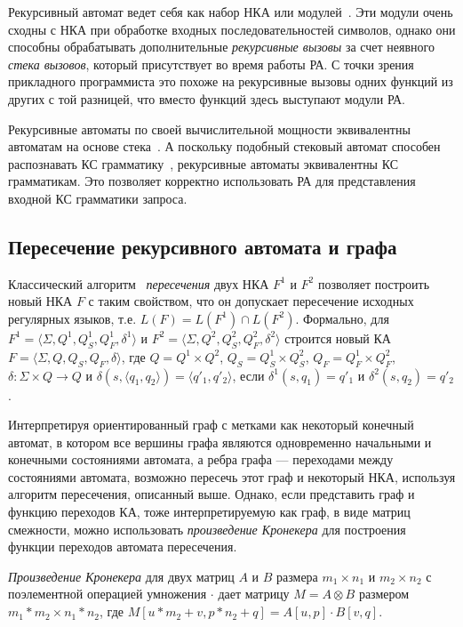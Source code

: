 Рекурсивный автомат ведет себя как набор НКА или модулей~\cite{article:recursive_state_machines}. Эти модули очень сходны с НКА при обработке входных последовательностей символов, однако они способны обрабатывать дополнительные \textit{рекурсивные вызовы} за счет неявного \textit{стека вызовов}, который присутствует во время работы РА. С точки зрения прикладного программиста это похоже на рекурсивные вызовы одних функций из других с той разницей, что вместо функций здесь выступают модули РА.

Рекурсивные автоматы по своей вычислительной мощности эквивалентны автоматам на основе стека~\cite{article:recursive_state_machines}. А поскольку подобный стековый автомат способен распознавать КС грамматику~\cite{book:automata_theory}, рекурсивные автоматы эквивалентны КС грамматикам. Это позволяет корректно использовать РА для представления входной КС грамматики запроса.

\subsection{Пересечение рекурсивного автомата и графа}

Классический алгоритм~\cite{book:automata_theory} \textit{пересечения} двух НКА $F^1$ и $F^2$ позволяет построить новый НКА $F$ с таким свойством, что он допускает пересечение исходных регулярных языков, т.е. $L(F) = L(F^1) \cap L(F^2)$. Формально, для $F^1 = \langle \Sigma, Q^1, Q^1_S, Q^1_F, \delta^1 \rangle$ и $F^2 = \langle \Sigma, Q^2, Q^2_S, Q^2_F, \delta^2 \rangle$ строится новый КА $F = \langle \Sigma, Q, Q_S, Q_F, \delta \rangle$, где $Q = Q^1 \times Q^2$, $Q_S = Q^1_S \times Q^2_S$, $Q_F = Q^1_F \times Q^2_F$, $\delta: \Sigma \times Q \rightarrow Q$ и $\delta(s, \langle q_1, q_2 \rangle) = \langle q'_1, q'_2 \rangle$, если $\delta^1 (s, q_1)=q'_1$ и $\delta^2 (s, q_2)=q'_2$. 

Интерпретируя ориентированный граф с метками как некоторый конечный автомат, в котором все вершины графа являются одновременно начальными и конечными состояниями автомата, а ребра графа --- переходами между состояниями автомата, возможно пересечь этот граф и некоторый НКА, используя алгоритм пересечения, описанный выше. Однако, если представить граф и функцию переходов КА, тоже интерпретируемую как граф, в виде матриц смежности, можно использовать \textit{произведение Кронекера} для построения функции переходов автомата пересечения.

\textit{Произведение Кронекера} для двух матриц $A$ и $B$ размера $m_1 \times n_1$ и $m_2 \times n_2$ с поэлементной операцией умножения $\cdot$ дает матрицу $M = A \otimes B$ размером $m_1 * m_2 \times n_1 * n_2$, где $M[u * m_2 + v, p * n_2 + q] = A[u, p] \cdot B[v, q]$. 

